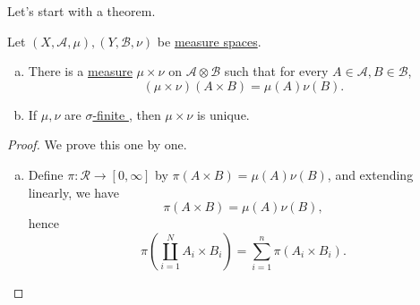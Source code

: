 Let's start with a theorem.
\begin{theorem}
	Let \((X, \mathcal{A} , \mu ), (Y, \mathcal{B} , \nu )\) be \hyperref[def:measure-space]{measure spaces}.
	\begin{enumerate}[(a)]
		\item There is a \hyperref[def:measure]{measure} \(\mu \times \nu \) on \(\mathcal{A} \otimes \mathcal{B} \) such that for every \(A\in \mathcal{A} , B\in \mathcal{B} \),
		      \[
			      (\mu \times \nu )(A\times B) = \mu (A)\nu (B).
		      \]
		\item If \(\mu , \nu \) are \hyperref[def:sigma-finite-measure]{\(\sigma\)-finite }, then \(\mu \times \nu \) is unique.
	\end{enumerate}
\end{theorem}
\begin{proof}
	We prove this one by one.
	\begin{enumerate}[(a)]
		\item Define \(\pi \colon \mathcal{R} \to [0, \infty ]\) by \(\pi (A \times B) = \mu (A)\nu (B)\), and extending linearly, we have
		      \[
			      \pi (A\times B) = \mu (A)\nu (B),
		      \]
		      hence
		      \[
			      \pi \left(\coprod_{i=1}^{N} A_{i} \times B_{i} \right) = \sum_{i=1}^{n} \pi (A_{i} \times B_{i}).
		      \]


\end{enumerate}
\end{proof}
